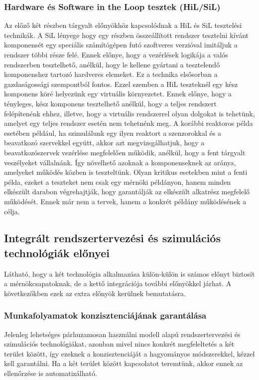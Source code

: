         \subsubsection{Hardware és Software in the Loop tesztek (HiL/SiL)}
        Az előző két részben tárgyalt előnyökhöz kapcsolódnak a HiL és SiL tesztelési technikák.
        A SiL lényege hogy egy részben összeállított rendszer tesztelni kívánt komponensét egy speciális számítógépen futó szoftveres verzióval imitáljuk a rendszer többi része felé.
        Ennek előnye, hogy a vezérlések logikája a valós rendszerben tesztelhető, anélkül, hogy le kellene gyártani a tesztelendő komponenshez tartozó hardveres elemeket.
        Ez a technika elsősorban a gazdaságossági szempontból fontos.
        Ezzel szemben a HiL teszteknél egy kész komponens köré helyezünk egy virtuális környezetet.
        Ennek előnye, hogy a tényleges, kész komponens tesztelhető anélkül, hogy a teljes rendszert felépítenénk ehhez, illetve, hogy a virtuális rendszerrel olyan dolgokat is tehetünk, amelyet egy teljes rendszer esetén nem tehetnénk meg.
        A korábbi reaktoros példa esetében például, ha szimulálunk egy ilyen reaktort a szenzorokkal és a beavatkozó szervekkel együtt, akkor azt megvizsgálhatjuk, hogy a beavatkozószervek vezérlése megfelelően működik, anélkül, hogy a fent tárgyalt veszélyeket vállalnánk.
        Így növelhető azoknak a komponenseknek az aránya, amelyeket működés közben is teszteltünk.
        Olyan kritikus esetekben mint a fenti példa, ezeket a teszteket nem csak egy mérnöki példányon, hanem minden elkészült darabon végrehajtják, hogy garantálják az elkészült alkatrész megfelelő működését.
        Ennek már nem a tervek, hanem a konkrét példány működésének a célja.

    \subsection{Integrált rendszertervezési és szimulációs technológiák előnyei} \label{IntegracioElonyei}
    Látható, hogy a két technológia alkalmazása külön-külön is számos előnyt biztosít a mérnökcsapatoknak, de a kettő integrációja további előnyökkel járhat.
    A következőkben ezek az extra előnyök kerülnek bemutatásra.

        \subsubsection{Munkafolyamatok konzisztenciájának garantálása}
        Jelenleg lehetséges párhuzamosan használni modell alapú rendszertervezési és szimulációs technológiákat, azonban mivel nincs konkrét megfeleltetés a két terület között, így ezeknek a konzisztenciáját a hagyományos módszerekkel, kézzel kell garantálni.
        Ha a két terület között kapcsolatot teremtünk, akkor ennek az ellenőrzése is automatizálható.

